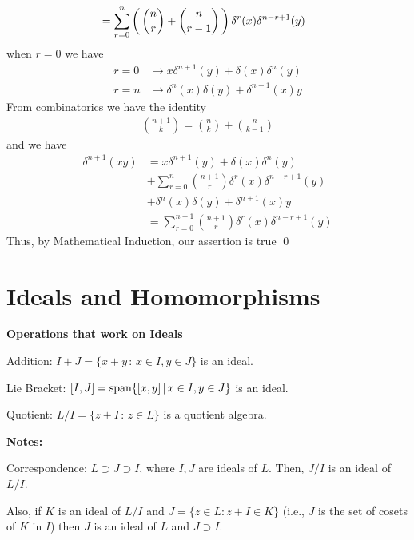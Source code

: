 \documentclass[12pt,a4paper]{report}
\begin{document}
\begin{enumerate}[label=\textit{1.\arabic*}]
{\begin{align*}
	&= \sum_{r=0}^n\left (\, \binom{n}{r}+\binom{n}{r-1} \,\right )\delta^r(x)\delta^{n-r+1}(y) 
\end{align*}
when $r=0$ we have
\begin{align*}
	r=0 & \to x\delta^{n+1}(y) + \delta(x)\delta^{n}(y) \\
	r=n & \to \delta^n(x)\delta(y) + \delta^{n+1}(x)y
\end{align*}From combinatorics we have the identity
\begin{align*}
	\binom{n+1}{k} = \binom{n}{k}+\binom{n}{k-1}
\end{align*}and we have 
\begin{align*}
	\delta^{n+1}(xy) &= x\delta^{n+1}(y) + \delta(x)\delta^{n}(y)\\&+ \sum_{r=0}^n\binom{n+1}{r}\delta^r(x)\delta^{n-r+1}(y) \\&+\delta^n(x)\delta(y) + \delta^{n+1}(x)y \\
	&= \sum_{r=0}^{n+1}\binom{n+1}{r}\delta^r(x)\delta^{n-r+1}(y)
\end{align*}Thus, by Mathematical Induction, our assertion is true \qed
}

\end{enumerate}

\chapter{Ideals and Homomorphisms}

\textbf{Operations that work on Ideals}

\begin{description}
\item Addition: $I+J=\{x+y\,:\, x\in I, y\in J\}$ is an ideal.
\item Lie Bracket: $[I,J]=\operatorname{span}\{[x,y]\,|\,x\in I, y\in J\}$ is an ideal.
\item Quotient: $L/I = \{z+I\,:\, z\in L\}$ is a quotient algebra.
\end{description}

\textbf{Notes:}

\begin{description}
	\item Correspondence: $L \supset J \supset I$, where $I,J$ are ideals of $L$.  Then, $J/I$ is an ideal of $L/I$.  
	
	Also, if $K$ is an ideal of $L/I$ and $J=\{z \in L : z+I\in K\}$ (i.e., $J$ is the set of cosets of $K$ in $I$) then $J$ is an ideal of $L$ and $J \supset I$.
\end{description}
\end{document}
